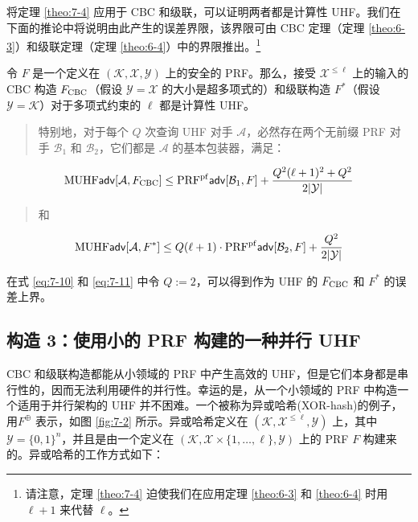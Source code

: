 \begin{snote}
将定理 \ref{theo:7-4} 应用于 CBC 和级联，可以证明两者都是计算性 UHF。我们在下面的推论中将说明由此产生的误差界限，该界限可由 CBC 定理（定理 \ref{theo:6-3}）和级联定理（定理 \ref{theo:6-4}）中的界限推出。\footnote{请注意，定理 \ref{theo:7-4} 迫使我们在应用定理 \ref{theo:6-3} 和 \ref{theo:6-4} 时用 $\ell+1$ 来代替 $\ell$。}
\end{snote}

\begin{corollary}\label{cor:7-5}
令 $F$ 是一个定义在 $(\mathcal{K},\mathcal{X},\mathcal{Y})$ 上的安全的 PRF。那么，接受 $\mathcal{X}^{\leq\ell}$ 上的输入的 CBC 构造 $F_{\rm CBC}$（假设 $\mathcal{Y}=\mathcal{X}$ 的大小是超多项式的）和级联构造 $F^*$（假设 $\mathcal{Y}=\mathcal{K}$）对于多项式约束的 $\ell$ 都是计算性 UHF。
\begin{quote}
特别地，对于每个 $Q$ 次查询 UHF 对手 $\mathcal{A}$，必然存在两个无前缀 PRF 对手 $\mathcal{B}_1$ 和 $\mathcal{B}_2$，它们都是 $\mathcal{A}$ 的基本包装器，满足：
\end{quote}
\begin{equation}\label{eq:7-10}
{\rm MUHF}\mathsf{adv}[\mathcal{A},F_{\rm CBC}]\leq{\rm PRF^{pf}}\mathsf{adv}[\mathcal{B}_1,F]+\frac{Q^2(\ell+1)^2+Q^2}{2|\mathcal{Y}|}
\end{equation}
\begin{quote}
和
\end{quote}
\begin{equation}\label{eq:7-11}
{\rm MUHF}\mathsf{adv}[\mathcal{A},F^*]\leq Q(\ell+1)\cdot{\rm PRF^{pf}}\mathsf{adv}[\mathcal{B}_2,F]+\frac{Q^2}{2|\mathcal{Y}|}
\end{equation}
\end{corollary}

\noindent
在式 \ref{eq:7-10} 和 \ref{eq:7-11} 中令 $Q:=2$，可以得到作为 UHF 的 $F_{\rm CBC}$ 和 $F^*$ 的误差上界。

\subsection{构造 3：使用小的 PRF 构建的一种并行 UHF}\label{subsec:7-2-3}

CBC 和级联构造都能从小领域的 PRF 中产生高效的 UHF，但是它们本身都是串行性的，因而无法利用硬件的并行性。幸运的是，从一个小领域的 PRF 中构造一个适用于并行架构的 UHF 并不困难。一个被称为异或哈希(XOR-hash)的例子，用$F^\oplus$ 表示，如图 \ref{fig:7-2} 所示。异或哈希定义在 $(\mathcal{K},\mathcal{X}^{\leq\ell},\mathcal{Y})$ 上，其中 $\mathcal{Y}=\{0,1\}^n$，并且是由一个定义在 $(\mathcal{K},\mathcal{X}\times\{1,\dots,\ell\},\mathcal{Y})$ 上的 PRF $F$ 构建来的。异或哈希的工作方式如下：

